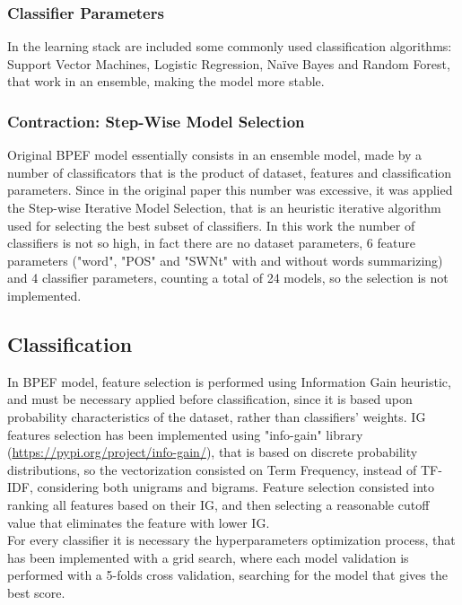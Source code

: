 \subsubsection{Classifier Parameters}

In the learning stack are included some commonly used classification algorithms: Support Vector Machines, Logistic Regression, Na{\"i}ve Bayes and Random Forest, that work in an ensemble, making the model more stable.


\subsubsection{Contraction: Step-Wise Model Selection}

Original BPEF model essentially consists in an ensemble model, made by a number of classificators that is the product of dataset, features and classification parameters. Since in the original paper this number was excessive, it was applied the Step-wise Iterative Model Selection, that is an heuristic iterative algorithm used for selecting the best subset of classifiers. In this work the number of classifiers is not so high, in fact there are no dataset parameters, 6 feature parameters ("word", "POS" and "SWNt" with and without words summarizing) and 4 classifier parameters, counting a total of 24 models, so the selection is not implemented.

\subsection{Classification}

In BPEF model, feature selection is performed using Information Gain heuristic, and must be necessary applied before classification, since it is based upon probability characteristics of the dataset, rather than classifiers' weights. IG features selection has been implemented using "info-gain" library (\url{https://pypi.org/project/info-gain/}), that is based on discrete probability distributions, so the vectorization consisted on Term Frequency, instead of TF-IDF, considering both unigrams and bigrams. Feature selection consisted into ranking all features based on their IG, and then selecting a reasonable cutoff value that eliminates the feature with lower IG.\\
For every classifier it is necessary the hyperparameters optimization process, that has been implemented with a grid search, where each model validation is performed with a 5-folds cross validation, searching for the model that gives the best score.


